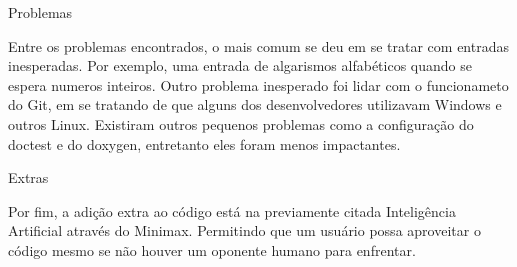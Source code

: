 Problemas
\begin{DoxyItemize}
\item Entre os problemas encontrados, o mais comum se deu em se tratar com entradas inesperadas. Por exemplo, uma entrada de algarismos alfabéticos quando se espera numeros inteiros. Outro problema inesperado foi lidar com o funcionameto do Git, em se tratando de que alguns dos desenvolvedores utilizavam Windows e outros Linux. Existiram outros pequenos problemas como a configuração do doctest e do doxygen, entretanto eles foram menos impactantes.
\end{DoxyItemize}

Extras
\begin{DoxyItemize}
\item Por fim, a adição extra ao código está na previamente citada Inteligência Artificial através do Minimax. Permitindo que um usuário possa aproveitar o código mesmo se não houver um oponente humano para enfrentar. 
\end{DoxyItemize}
